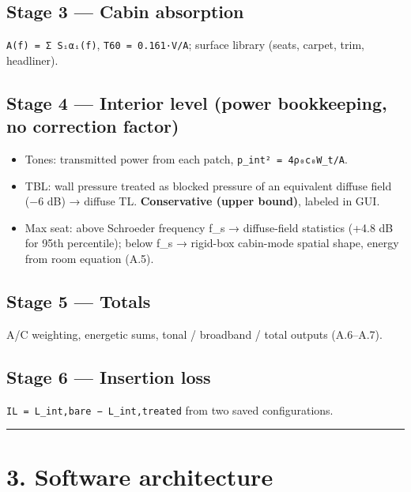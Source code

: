 \documentclass[10pt,a4paper]{article}
\begin{document}
\subsection*{Stage 3 — Cabin absorption}

\texttt{A(f) = Σ Sᵢαᵢ(f)}, \texttt{T60 = 0.\allowbreak{}161·V/\allowbreak{}A}; surface library (seats, carpet, trim, headliner).

\subsection*{Stage 4 — Interior level (power bookkeeping, no correction factor)}

\begin{itemize}
\item Tones: transmitted power from each patch, \texttt{p\_\allowbreak{}int² = 4ρ₀c₀W\_\allowbreak{}t/\allowbreak{}A}.
\item TBL: wall pressure treated as blocked pressure of an equivalent diffuse field (−6 dB) → diffuse TL. \textbf{Conservative (upper bound)}, labeled in GUI.
\item Max seat: above Schroeder frequency f\_s → diffuse-field statistics (+4.8 dB for 95th percentile); below f\_s → rigid-box cabin-mode spatial shape, energy from room equation (A.5).
\end{itemize}

\subsection*{Stage 5 — Totals}

A/C weighting, energetic sums, tonal / broadband / total outputs (A.6–A.7).

\subsection*{Stage 6 — Insertion loss}

\texttt{IL = L\_\allowbreak{}int,bare − L\_\allowbreak{}int,treated} from two saved configurations.

\noindent\rule{\linewidth}{0.4pt}

\section*{3. Software architecture}
\end{document}
